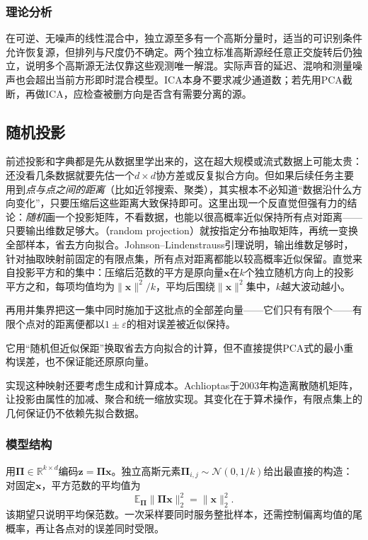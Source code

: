 \subsubsection{理论分析}

在可逆、无噪声的线性混合中，独立源至多有一个高斯分量时，适当的可识别条件允许恢复源，但排列与尺度仍不确定。两个独立标准高斯源经任意正交旋转后仍独立，说明多个高斯源无法仅靠这些观测唯一解混。实际声音的延迟、混响和测量噪声也会超出当前方形即时混合模型。ICA本身不要求减少通道数；若先用PCA截断，再做ICA，应检查被删方向是否含有需要分离的源。

\subsection{随机投影}
\label{sec:dim-rp}

前述投影和字典都是先从数据里学出来的，这在超大规模或流式数据上可能太贵：还没看几条数据就要先估一个$d\times d$协方差或反复拟合方向。但如果后续任务主要用到\emph{点与点之间的距离}（比如近邻搜索、聚类），其实根本不必知道“数据沿什么方向变化”，只要压缩后这些距离大致保持即可。这里出现一个反直觉但强有力的结论：\emph{随机}画一个投影矩阵，不看数据，也能以很高概率近似保持所有点对距离——只要输出维数足够大。（random projection）就按指定分布抽取矩阵，再统一变换全部样本，省去方向拟合。Johnson--Lindenstrauss引理说明，输出维数足够时，针对抽取映射前固定的有限点集，所有点对距离都能以较高概率近似保留。直觉来自投影平方和的集中：压缩后范数的平方是原向量$\bm{x}$在$k$个独立随机方向上的投影平方之和，每项均值均为$\lVert\bm{x}\rVert^2/k$，平均后围绕$\lVert\bm{x}\rVert^2$集中，$k$越大波动越小。

再用并集界把这一集中同时施加于这批点的全部差向量——它们只有有限个——有限个点对的距离便都以$1\pm\varepsilon$的相对误差被近似保持。

它用“随机但近似保距”换取省去方向拟合的计算，但不直接提供PCA式的最小重构误差，也不保证能还原原向量。

实现这种映射还要考虑生成和计算成本。Achlioptas于2003年构造离散随机矩阵，让投影由属性的加减、聚合和统一缩放实现。其变化在于算术操作，有限点集上的几何保证仍不依赖先拟合数据。

\subsubsection{模型结构}
\label{sec:dim-rp-structure}

用$\bm{\Pi}\in\mathbb{R}^{k\times d}$编码$\bm{z}=\bm{\Pi}\bm{x}$。独立高斯元素$\bm{\Pi}_{i,j}\sim\mathcal{N}(0,1/k)$给出最直接的构造：对固定$\bm{x}$，平方范数的平均值为
\[
  \mathbb{E}_{\bm{\Pi}}\lVert\bm{\Pi}\bm{x}\rVert_2^2
  =\lVert\bm{x}\rVert_2^2.
\]
该期望只说明平均保范数。一次采样要同时服务整批样本，还需控制偏离均值的尾概率，再让各点对的误差同时受限。

